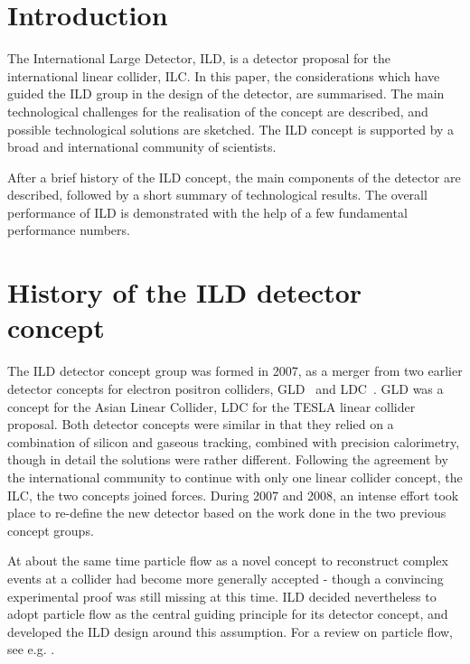 \documentclass[%
 amsmath,amssymb,
 aps,
]{revtex4-1}
\begin{document}


\maketitle


\section{\label{sec:level1}Introduction}
The International Large Detector, ILD, is a detector proposal for the international linear collider, ILC. In this paper, the considerations which have guided the ILD group in the design of the detector, are summarised. The main technological challenges for the realisation of the concept are described, and possible technological solutions are sketched. The ILD concept is supported by a broad and international community of scientists. 

After a brief history of the ILD concept, the main components of the detector are described, followed by a short summary of technological results. The overall performance of ILD is demonstrated with the help of a few fundamental performance numbers. 
\section{History of the ILD detector concept}
The ILD detector concept group was formed in 2007, as a merger from two earlier detector concepts for electron positron colliders, GLD~\cite{ild:bib:ref-gld} and LDC~\cite{ild:bib:ref-ldc}. GLD was a concept for the Asian Linear Collider, LDC for the TESLA linear collider proposal. Both detector concepts were similar in that they relied on a combination of silicon and gaseous tracking, combined with precision calorimetry, though in detail the solutions were rather different. Following the agreement by the international community to continue with only one linear collider concept, the ILC, the two concepts joined forces. During 2007 and 2008, an intense effort took place to re-define the new detector based on the work done in the two previous concept groups. 

At about the same time particle flow as a novel concept to reconstruct complex events at a collider had become more generally accepted - though a convincing experimental proof was still missing at this time. ILD decided nevertheless to adopt particle flow as the central guiding principle for its detector concept, and developed the ILD design around this assumption. For a review on particle flow, see e.g. \cite{ild:bib:PandoraPFA}.
\end{document}
